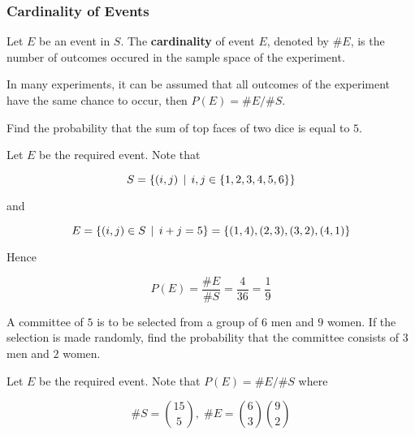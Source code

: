 \documentclass[a4paper,12pt]{article}
\begin{document}
\subsubsection{Cardinality of Events}
\begin{dft}
  Let $E$ be an event in $S$. The \textbf{cardinality} of event $E$, denoted by $\#E$, is the number of outcomes occured in the sample space of the experiment.
\end{dft}\n

In many experiments, it can be assumed that all outcomes of the experiment have the same chance to occur, then $P(E)=\#E/\#S$.\n

\begin{exm}
  Find the probability that the sum of top faces of two dice is equal to $5$.\n

  \ans Let $E$ be the required event. Note that

  $$S=\left\{ (i,j)\,\mid\, i,j\in\left\{ 1,2,3,4,5,6\right\}\right\}$$\s

  and

  $$E=\left\{ (i,j)\in S\,\mid\, i+j=5\right\}=\left\{ (1,4),(2,3),(3,2),(4,1)\right\}$$\s

  Hence

  $$P(E)=\frac{\#E}{\#S}=\frac{4}{36}=\frac{1}{9}$$
\end{exm}\n

\begin{exm}
  A committee of $5$ is to be selected from a group of $6$ men and $9$ women. If the selection is made randomly, find the probability that the committee consists of $3$ men and $2$ women.\n

  \ans Let $E$ be the required event. Note that $P(E)=\#E/\#S$ where

  $$\#S=\binom{15}{5},\;\#E=\binom{6}{3}\binom{9}{2}$$
\end{exm}\n
\end{document}
